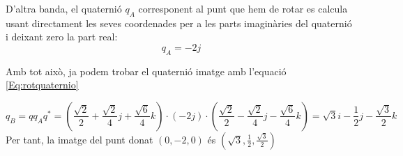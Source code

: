 D'altra banda, el quaternió $q_A$ corresponent al punt que hem de rotar es calcula usant directament les seves coordenades per a les parts imaginàries del quaternió i deixant zero la part real:
\[
  q_A=  -2j 
\]

Amb tot això, ja podem trobar el quaternió imatge amb l'equació \ref{Eq:rotquaternio}

\[
  q_B= qq_Aq^*  =  \left(\frac{\sqrt{2}}{2}+\frac{\sqrt{2}}{4}j+\frac{\sqrt{6}}{4}k\right) \cdot 
  ( -2j) \cdot \left(\frac{\sqrt{2}}{2}-\frac{\sqrt{2}}{4}j-\frac{\sqrt{6}}{4}k\right)=\sqrt{3}i-\frac{1}{2}j-\frac{\sqrt{3}}{2}k
\]
Per tant, la imatge del punt donat $(0,-2,0)$ és $\left(\sqrt{3},\frac{1}{2},\frac{\sqrt{3}}{2}\right)$
\blacksquare
